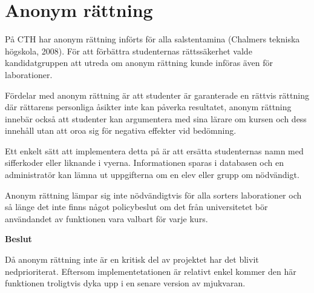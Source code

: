 \section{Anonym rättning}

På CTH har anonym rättning införts för alla salstentamina (Chalmers tekniska högskola, 2008). För att förbättra studenternas rättssäkerhet valde kandidatgruppen att utreda om anonym rättning kunde införas även för laborationer.

Fördelar med anonym rättning är att studenter är garanterade en rättvis rättning där rättarens personliga åsikter inte kan påverka resultatet, anonym rättning innebär också att studenter kan argumentera med sina lärare om kursen och dess innehåll utan att oroa sig för negativa effekter vid bedömning.

Ett enkelt sätt att implementera detta på är att ersätta studenternas namn med sifferkoder eller liknande i vyerna. Informationen sparas i databasen och en administratör kan lämna ut uppgifterna om en elev eller grupp om nödvändigt.

Anonym rättning lämpar sig inte nödvändigtvis för alla sorters laborationer och så länge det inte finns något policybeslut om det från universitetet bör användandet av funktionen vara valbart för varje kurs.

\begin{flushright}

  \textbf{Beslut}

  Då anonym rättning inte är en kritisk del av projektet har det blivit nedprioriterat.
Eftersom implementetationen är relativt enkel kommer den här funktionen troligtvis dyka upp i en senare version av mjukvaran.
\end{flushright}

